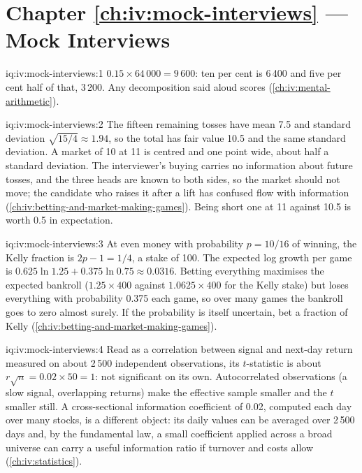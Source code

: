 \section*{Chapter \ref{ch:iv:mock-interviews} --- Mock Interviews}

\begin{solution}{iq:iv:mock-interviews:1}
$0.15 \times 64\,000 = 9\,600$: ten per cent is 6\,400 and five per cent half of that, 3\,200. Any decomposition said aloud scores
(\cref{ch:iv:mental-arithmetic}).
\end{solution}

\begin{solution}{iq:iv:mock-interviews:2}
The fifteen remaining tosses have mean 7.5 and standard deviation $\sqrt{15/4} \approx 1.94$, so the total has fair value 10.5 and
the same standard deviation. A market of 10 at 11 is centred and one point wide, about half a standard deviation. The interviewer's
buying carries no information about future tosses, and the three heads are known to both sides, so the market should not move; the
candidate who raises it after a lift has confused flow with information (\cref{ch:iv:betting-and-market-making-games}). Being short
one at 11 against 10.5 is worth 0.5 in expectation.
\end{solution}

\begin{solution}{iq:iv:mock-interviews:3}
At even money with probability $p = 10/16$ of winning, the Kelly fraction is $2p - 1 = 1/4$, a stake of 100. The expected log growth
per game is $0.625 \ln 1.25 + 0.375 \ln 0.75 \approx 0.0316$. Betting everything maximises the expected bankroll ($1.25 \times 400$
against $1.0625 \times 400$ for the Kelly stake) but loses everything with probability 0.375 each game, so over many games the
bankroll goes to zero almost surely. If the probability is itself uncertain, bet a fraction of Kelly (\cref{ch:iv:betting-and-market-making-games}).
\end{solution}

\begin{solution}{iq:iv:mock-interviews:4}
Read as a correlation between signal and next-day return measured on about 2\,500 independent observations, its $t$-statistic is
about $r\sqrt n = 0.02 \times 50 = 1$: not significant on its own. Autocorrelated observations (a slow signal, overlapping returns)
make the effective sample smaller and the $t$ smaller still. A cross-sectional information coefficient of 0.02, computed each day
over many stocks, is a different object: its daily values can be averaged over 2\,500 days and, by the fundamental law, a small
coefficient applied across a broad universe can carry a useful information ratio if turnover and costs allow
(\cref{ch:iv:statistics}).
\end{solution}

